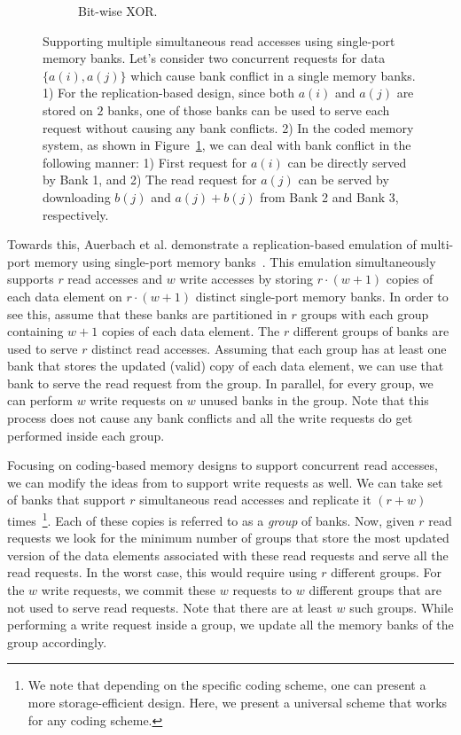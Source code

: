 \begin{figure}[t!]
\begin{subfigure}{0.43\linewidth}
  \caption{Bit-wise XOR.}
  \label{fig:emulation_ec}
\end{subfigure}
\caption{Supporting multiple simultaneous read accesses using single-port memory banks. Let's consider two concurrent requests for data  $\{a(i), a(j)\}$ which cause bank conflict in a single memory banks. 1)  For the replication-based design, since both $a(i)$ and $a(j)$ are stored on $2$ banks, one of those banks can be used to serve each request without causing any bank conflicts. 2) In the coded memory system, as shown in Figure~\ref{fig:emulation_ec}, we can deal with bank conflict in the following manner:  1) First request for $a(i)$ can be directly served by Bank 1, and 2) The read request for $a(j)$ can be served by downloading $b(j)$ and $a(j) + b(j)$ from Bank 2 and Bank 3, respectively.}
\label{fig:emulation}
\end{figure}

Towards this, Auerbach et al. demonstrate a replication-based emulation of multi-port memory using single-port memory banks~\cite{ACP88}. This emulation simultaneously supports $r$ read accesses and $w$ write accesses by storing $r\cdot(w + 1)$ copies of each data element on $r\cdot(w+1)$ distinct single-port memory banks. In order to see this, assume that these banks are partitioned in $r$ groups with each group containing $w + 1$ copies of each data element. The $r$ different groups of banks are used to serve $r$ distinct read accesses. Assuming that each group has at least one bank that stores the updated (valid) copy of each data element, we can use that bank to serve the read request from the group. In parallel, for every group, we can perform $w$ write requests on $w$ unused banks in the group. Note that this process does not cause any bank conflicts and all the write requests do get performed inside each group. 

Focusing on coding-based memory designs to support concurrent read accesses, we can modify the ideas from \cite{ACP88} to support write requests as well. We can take set of banks that support $r$ simultaneous read accesses and replicate it $(r+w)$ times~\footnote{We note that depending on the specific coding scheme, one can present a more storage-efficient design. Here, we present a universal scheme that works for any coding scheme.}. Each of these copies is referred to as a \textit{group} of banks. Now, given $r$ read requests we look for the minimum number of groups that store the most updated version of the data elements associated with these read requests and serve all the read requests. In the worst case, this would require using $r$ different groups. For the $w$ write requests, we commit these $w$ requests to $w$ different groups that are not used to serve read requests. Note that there are at least $w$ such groups. While performing a write request inside a group, we update all the memory banks of the group accordingly. 

